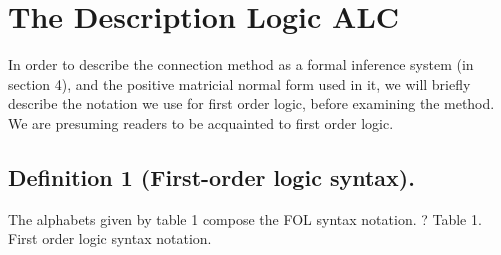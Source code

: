 \chapter{The Description Logic ALC}
\label{ch:thedescriptionlogicalc}

In order to describe the connection method as a formal inference system (in section 4), and the positive matricial normal form used in it, we will briefly describe the notation we use for first order logic, before examining the method. We are presuming readers to be acquainted to first order logic.

\section{Definition 1 (First-order logic syntax).}
The alphabets given by table 1 compose the FOL syntax notation.	? Table 1. First order logic syntax notation.